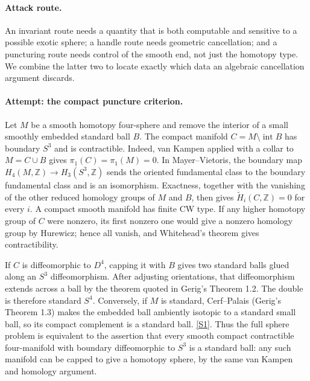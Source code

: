 \documentclass[11pt,a4paper]{article}
\newcommand{\Z}{\mathbb{Z}}
\newcommand{\sref}[2]{\hyperlink{source:#1:#2}{[S#2]}}
\begin{document}
\paragraph{Attack route.}
An invariant route needs a quantity that is both computable and sensitive
to a possible exotic sphere; a handle route needs geometric cancellation;
and a puncturing route needs control of the smooth end, not just the
homotopy type. We combine the latter two to locate exactly which data an
algebraic cancellation argument discards.

\paragraph{Attempt: the compact puncture criterion.}
Let $M$ be a smooth homotopy four-sphere and remove the interior of a
small smoothly embedded standard ball $B$. The compact manifold
$C=M\setminus\operatorname{int}B$ has boundary $S^3$ and is contractible.
Indeed, van Kampen applied with a collar to $M=C\cup B$ gives
$\pi_1(C)=\pi_1(M)=0$. In Mayer--Vietoris, the boundary map
$H_4(M,\Z)\to H_3(S^3,\Z)$ sends the oriented fundamental class to the
boundary fundamental class and is an isomorphism. Exactness, together
with the vanishing of the other reduced homology groups of $M$ and $B$,
then gives $\widetilde H_i(C,\Z)=0$ for every $i$.
A compact smooth manifold has finite CW type. If any higher homotopy group
of $C$ were nonzero, its first nonzero one would give a nonzero homology
group by Hurewicz; hence all vanish, and Whitehead's theorem gives
contractibility.

If $C$ is diffeomorphic to $D^4$, capping it with $B$ gives two standard
balls glued along an $S^3$ diffeomorphism. After adjusting orientations,
that diffeomorphism extends across a ball by the theorem quoted in
Gerig's Theorem 1.2. The double is therefore standard $S^4$.
Conversely, if $M$ is standard, Cerf--Palais (Gerig's Theorem 1.3) makes
the embedded ball ambiently isotopic to a standard small ball, so its
compact complement is a standard ball. \sref{18}{1}.
Thus the full sphere problem is equivalent to the assertion that every
smooth compact contractible four-manifold with boundary diffeomorphic to
$S^3$ is a standard ball: any such manifold can be capped to give a
homotopy sphere, by the same van Kampen and homology argument.
\end{document}

